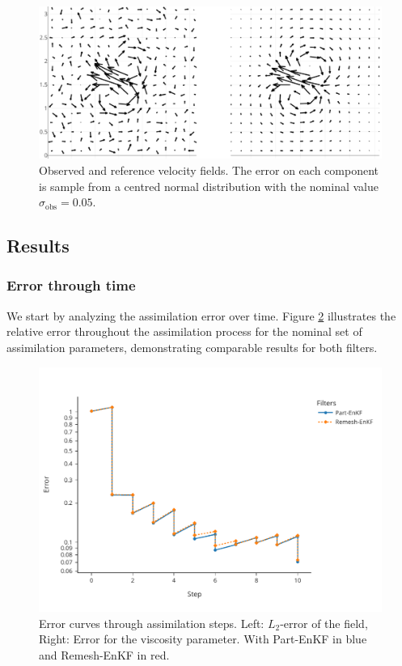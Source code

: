 \begin{figure}[htbp]
	\centering
	\includegraphics[width=0.8\linewidth]{images/app2d/velocity_ref_recadre.pdf}
	\caption{Observed and reference velocity fields. The error on each component is sample from a centred normal distribution with the nominal value $\sigma_{\text{obs}} = 0.05$.}
	\label{fig:velocity}
\end{figure}




\newpage

\subsection{Results}

\subsubsection{Error through time}


We start by analyzing the assimilation error over time. Figure \ref{fig:assim_time} illustrates the relative error throughout the assimilation process for the nominal set of assimilation parameters, demonstrating comparable results for both filters.

\begin{figure}[htbp]
	\centering
	\includegraphics*[width=0.7\linewidth]{images/app2d/final/error_in_time.pdf}
	\caption{Error curves through assimilation steps. Left: \(L_2\)-error of the field, Right: Error for the viscosity parameter. With Part-EnKF in blue and Remesh-EnKF in red.}
	\label{fig:assim_time}
\end{figure}


